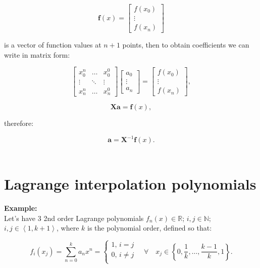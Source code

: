 \documentclass[10pt,b5paper,titlepage]{book}
\begin{document}
\begin{equation}
    \mathbf{f}(x) =
    \begin{bmatrix}
        f(x_{0}) \\
        \vdots \\
        f(x_{n})
    \end{bmatrix}
\end{equation}

is a vector of function values at $n + 1$ points, then to obtain coefficients
we can write in matrix form:

\begin{equation}
    \begin{bmatrix}
        x_0^{n} & \ldots & x_0^{0} \\
        \vdots & \ddots & \vdots \\
        x_{n}^{n} & \ldots & x_{n}^{0}
    \end{bmatrix}
    \begin{bmatrix}
        a_{0} \\
        \vdots \\
        a_{n}
    \end{bmatrix}
    =
    \begin{bmatrix}
        f(x_{0}) \\
        \vdots \\
        f(x_{n})
    \end{bmatrix}
,\end{equation}

\begin{equation}
    \mathbf{X}\mathbf{a} = \mathbf{f}(x)
,\end{equation}

therefore:

\begin{equation}
    \mathbf{a} = \mathbf{X}^{-1} \mathbf{f}(x)
.\end{equation}\\

\section{Lagrange interpolation polynomials}
\textbf{Example:}\\

Let's have 3 2nd order Lagrange polynomials
$f_{n}(x) \in \mathbb{R}$; $i, j \in \mathbb{N}$; $i, j \in \left< 1, k + 1 \right>$,
where $k$ is the polynomial order, defined so that:

\begin{equation}
    f_{i}(x_{j}) = \sum_{n=0}^{k} a_{n}x^{n}
          = \left\{
              \begin{array}{l}
                  1 \text{, } i = j \\
                  0 \text{, } i \neq j \\
              \end{array}
          \right. \quad \forall \quad x_{j} \in \left\{
                0, \frac{1}{k}, \ldots, \frac{k - 1}{k}, 1
          \right\}
.\end{equation}
\end{document}
